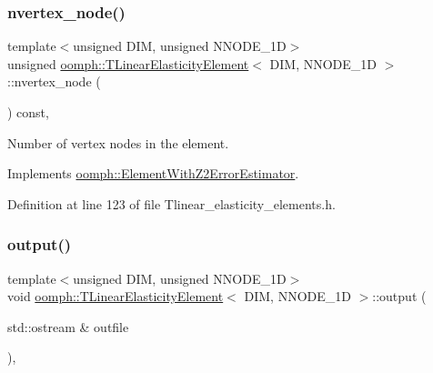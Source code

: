 \subsubsection{\texorpdfstring{nvertex\+\_\+node()}{nvertex\_node()}}
{\footnotesize\ttfamily template$<$unsigned D\+IM, unsigned N\+N\+O\+D\+E\+\_\+1D$>$ \\
unsigned \hyperlink{classoomph_1_1TLinearElasticityElement}{oomph\+::\+T\+Linear\+Elasticity\+Element}$<$ D\+IM, N\+N\+O\+D\+E\+\_\+1D $>$\+::nvertex\+\_\+node (\begin{DoxyParamCaption}{ }\end{DoxyParamCaption}) const\hspace{0.3cm}{\ttfamily [inline]}, {\ttfamily [virtual]}}



Number of vertex nodes in the element. 



Implements \hyperlink{classoomph_1_1ElementWithZ2ErrorEstimator_a19495a0e77ef4ff35f15fdf7913b4077}{oomph\+::\+Element\+With\+Z2\+Error\+Estimator}.



Definition at line 123 of file Tlinear\+\_\+elasticity\+\_\+elements.\+h.

\mbox{\label{classoomph_1_1TLinearElasticityElement_a76af9620bf824adfd6bef204af7a8f81}} 
\subsubsection{\texorpdfstring{output()}{output()}\hspace{0.1cm}{\footnotesize\ttfamily [1/4]}}
{\footnotesize\ttfamily template$<$unsigned D\+IM, unsigned N\+N\+O\+D\+E\+\_\+1D$>$ \\
void \hyperlink{classoomph_1_1TLinearElasticityElement}{oomph\+::\+T\+Linear\+Elasticity\+Element}$<$ D\+IM, N\+N\+O\+D\+E\+\_\+1D $>$\+::output (\begin{DoxyParamCaption}\item[{std\+::ostream \&}]{outfile }\end{DoxyParamCaption})\hspace{0.3cm}{\ttfamily [inline]}, {\ttfamily [virtual]}}




